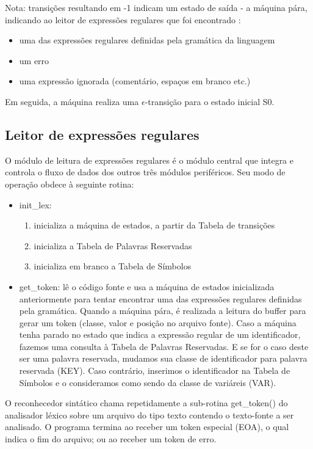 Nota: transições resultando em -1 indicam um estado de saída - a máquina pára, indicando ao leitor de expressões regulares que foi encontrado :

\begin{itemize}
	\item uma das expressões regulares definidas pela gramática da linguagem 
	\item um erro
	\item uma expressão ignorada (comentário, espaços em branco etc.)
\end{itemize}

Em seguida, a máquina realiza uma $\epsilon$-transição para o estado inicial S0.

\subsection{Leitor de expressões regulares}

O módulo de leitura de expressões regulares é o módulo central que integra e controla o fluxo de dados dos outros três módulos periféricos. Seu modo de operação obdece à seguinte rotina:

\begin{itemize}
	\item init\_lex:

	\begin{enumerate}
		\item inicializa a máquina de estados, a partir da Tabela de transições
		\item inicializa a Tabela de Palavras Reservadas
		\item inicializa em branco a Tabela de Símbolos
	\end{enumerate}

	\item get\_token: lê o código fonte e usa a máquina de estados inicializada anteriormente para tentar encontrar uma das expressões regulares definidas pela gramática. Quando a máquina pára, é realizada a leitura do buffer para gerar um token (classe, valor e posição no arquivo fonte). Caso a máquina tenha parado no estado que indica a expressão regular de um identificador, fazemos uma consulta à Tabela de Palavras Reservadas. E se for o caso deste ser uma palavra reservada, mudamos sua classe de identificador para palavra reservada (KEY). Caso contrário, inserimos o identificador na Tabela de Símbolos e o consideramos como sendo da classe de variáreis (VAR).
\end{itemize}

O reconhecedor sintático chama repetidamente a sub-rotina get\_token() do analisador léxico sobre um arquivo do tipo texto contendo o texto-fonte a ser analisado. O programa termina ao receber um token especial (EOA), o qual indica o fim do arquivo; ou ao receber um token de erro. 